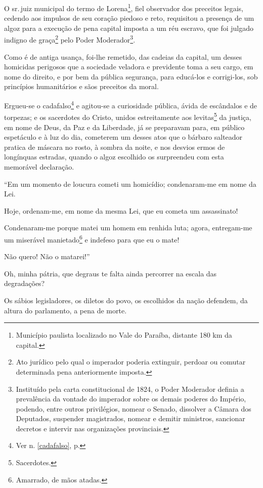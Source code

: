 O sr.\,juiz municipal do termo de Lorena\footnote{Município paulista
  localizado no Vale do Paraíba, distante 180 km da capital.}, fiel
observador dos preceitos legais, cedendo aos impulsos de seu coração
piedoso e reto, requisitou a presença de um algoz para a execução de
pena capital imposta a um réu escravo, que foi julgado indigno de
graça\footnote{Ato jurídico pelo qual o imperador poderia extinguir,
  perdoar ou comutar determinada pena anteriormente imposta.} pelo Poder
Moderador\footnote{Instituído pela carta constitucional de 1824, o
  Poder Moderador definia a prevalência da vontade do imperador sobre os
  demais poderes do Império, podendo, entre outros privilégios, nomear o
  Senado, dissolver a Câmara dos Deputados, suspender magistrados,
  nomear e demitir ministros, sancionar decretos e intervir nas
  organizações provinciais.\label{moderador}}.

Como é de antiga usança, foi-lhe remetido, das cadeias da capital, um
desses homicidas perigosos que a sociedade veladora e previdente toma a
seu cargo, em nome do direito, e por bem da pública segurança, para
educá-los e corrigi-los, sob princípios humanitários e sãos preceitos da
moral.

Ergueu-se o cadafalso\footnote{Ver n. \ref{cadafalso}, p. \pageref{cadafalso}} 
e agitou-se a curiosidade pública, ávida de escândalos e de
torpezas; e os sacerdotes do Cristo, unidos estreitamente aos
levitas\footnote{Sacerdotes.} da justiça, em nome de Deus, da Paz e da
Liberdade, já se preparavam para, em público espetáculo e à luz do dia,
cometerem um desses atos que o bárbaro salteador pratica de máscara no
rosto, à sombra da noite, e nos desvios ermos de longínquas estradas,
quando o algoz escolhido os surpreendeu com esta memorável declaração.

``Em um momento de loucura cometi um homicídio; condenaram-me em nome da
Lei.

Hoje, ordenam-me, em nome da mesma Lei, que eu cometa um assassinato!

Condenaram-me porque matei um homem em renhida luta; agora, entregam-me
um miserável manietado\footnote{Amarrado, de mãos atadas.} e indefeso
para que eu o mate!

Não quero! Não o matarei!''

Oh, minha pátria, que degraus te falta ainda percorrer na escala das
degradações?

Os sábios legisladores, os diletos do povo, os escolhidos da nação
defendem, da altura do parlamento, a pena de morte.

